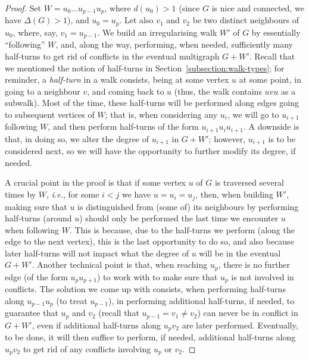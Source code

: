 \documentclass[a4paper,11pt,dvipsnames]{elsarticle}
\begin{document}
\begin{proof}
Set $W=u_0 \dots u_{p-1}u_p$, where $d(u_0) > 1$ (since $G$ is nice and connected, we have $\Delta(G)>1$),
and $u_0=u_p$.
Let also $v_1$ and $v_2$ be two distinct neighbours of $u_0$, where, say, $v_1=u_{p-1}$.
We build an irregularising walk $W'$ of $G$ by essentially ``following'' $W$, and, along the way, performing, when needed, sufficiently many half-turns to get rid of conflicts in the eventual multigraph $G+W'$. Recall that we mentioned the notion of half-turns in Section~\ref{subsection:walk-types}; for reminder, a \textit{half-turn} in a walk consists, being at some vertex $u$ at some point, in going to a neighbour $v$, and coming back to $u$ (thus, the walk contains $uvu$ as a subwalk). Most of the time, these half-turns will be performed along  edges going to subsequent vertices of $W$; that is, when considering any $u_i$, we will go to $u_{i+1}$ following $W$, and then perform half-turns of the form $u_{i+1}u_iu_{i+1}$.
A downside is that, in doing so, we alter the degree of $u_{i+1}$ in $G+W'$; however, $u_{i+1}$ is to be considered next, so we will have the opportunity to further modify its degree, if needed.

A crucial point in the proof is that if some vertex $u$ of $G$ is traversed several times by $W$, \textit{i.e.}, for some $i<j$ we have $u=u_i=u_j$, then, when building $W'$, making sure that $u$ is distinguished from (some of) its neighbours by performing half-turns (around $u$) should only be performed the last time we encounter $u$ when following $W$. This is because, due to the half-turns we perform (along the edge to the next vertex), this is the last opportunity to do so, and also because later half-turns will not impact what the degree of $u$ will be in the eventual $G+W'$. 
Another technical point is that, when reaching $u_p$, there is no further edge (of the form $u_pu_{p+1}$) to work with to make sure that $u_p$ is not involved in conflicts. The solution we come up with consists, when performing half-turns along $u_{p-1}u_p$ (to treat $u_{p-1}$), in performing additional half-turns, if needed, to guarantee that $u_p$ and $v_2$ (recall that $u_{p-1}=v_1 \neq v_2$) can never be in conflict in $G+W'$, even if additional half-turns along $u_pv_2$ are later performed. Eventually, to be done, it will then suffice to perform, if needed, additional half-turns along $u_pv_2$ to get rid of any conflicts involving $u_p$ or $v_2$.


\end{proof}
\end{document}
